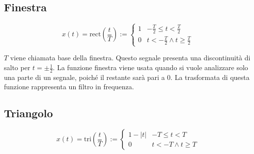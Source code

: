 \documentclass{article}
\numberwithin{equation}{subsection}
\begin{document}
\subsection{Finestra}

\begin{equation}
    x(t)=\mbox{rect}\left(\displaystyle\frac{t}{T}\right):=\begin{cases}
        1 & \displaystyle-\frac{T}{2}\leq t <\frac{T}{2}\\
        0 & \displaystyle t<-\frac{T}{2} \land t\geq\frac{T}{2}
    \end{cases}
\end{equation}

$T$ viene chiamata base della finestra. Questo segnale presenta una discontinuità di salto per $t=\pm\displaystyle\frac{1}{2}$. La funzione finestra viene usata quando si 
vuole analizzare solo una parte di un segnale, poiché il restante sarà pari a $0$. La trasformata di questa funzione rappresenta un filtro in frequenza. 

\begin{center}
\end{center}

\subsection{Triangolo}

\begin{equation}
    x(t)=\mbox{tri}\left(\displaystyle\frac{t}{T}\right):=\begin{cases}
        1-|t| & -T\leq t < T\\
        0 & t<-T \land t\geq T
    \end{cases}
\end{equation}

\begin{center}
\end{center}
\end{document}
